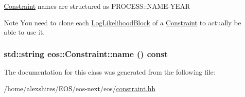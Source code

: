 \hyperlink{classeos_1_1Constraint}{Constraint} names are structured as PROCESS::NAME-\/YEAR

\begin{DoxyNote}{Note}
You need to clone each \hyperlink{classeos_1_1LogLikelihoodBlock}{LogLikelihoodBlock} of a \hyperlink{classeos_1_1Constraint}{Constraint} to actually be able to use it. 
\end{DoxyNote}
\hypertarget{classeos_1_1Constraint_a11a3e698b0a00527a6304c6b2ec70a1d}{
\subsubsection[{name}]{\setlength{\rightskip}{0pt plus 5cm}std::string eos::Constraint::name () const}}
\label{classeos_1_1Constraint_a11a3e698b0a00527a6304c6b2ec70a1d}


The documentation for this class was generated from the following file:\begin{DoxyCompactItemize}
\item 
/home/alexshires/EOS/eos-\/next/eos/\hyperlink{constraint_8hh}{constraint.hh}\end{DoxyCompactItemize}
